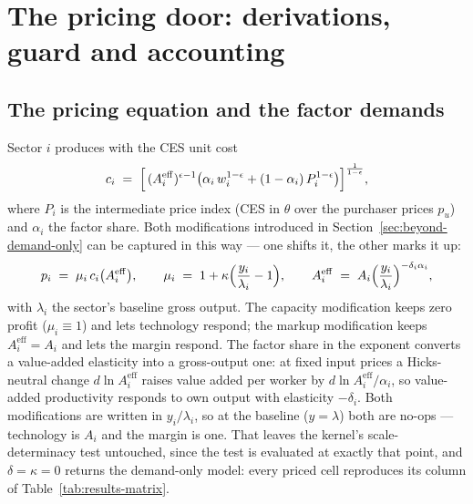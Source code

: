 \section{The pricing door: derivations, guard and accounting}\label{app:pricing-door}

\subsection{The pricing equation and the factor demands}\label{app:pricing-hooks}
Sector $i$ produces with the CES unit cost
\begin{equation}\label{eq:app-unit-cost}
  c_i \;=\; \Bigl[\,(A^{\mathrm{eff}}_i)^{\epsilon-1}\bigl(\alpha_i\,w_i^{1-\epsilon}
     + (1-\alpha_i)\,P_i^{1-\epsilon}\bigr)\Bigr]^{\frac{1}{1-\epsilon}},
\end{equation}
where $P_i$ is the intermediate price index (CES in $\theta$ over the purchaser
prices $p_u$) and $\alpha_i$ the factor share. Both modifications introduced in Section~\ref{sec:beyond-demand-only} can be captured in this way ---
one shifts it, the other marks it up:
\begin{equation}\label{eq:app-price-rule}
  p_i \;=\; \mu_i\,c_i\bigl(A^{\mathrm{eff}}_i\bigr),
  \qquad
  \mu_i \;=\; 1 + \kappa\Bigl(\frac{y_i}{\lambda_i} - 1\Bigr),
  \qquad
  A^{\mathrm{eff}}_i \;=\; A_i\Bigl(\frac{y_i}{\lambda_i}\Bigr)^{-\delta_i \alpha_i},
\end{equation}
with $\lambda_i$ the sector's baseline gross output. The capacity modification keeps zero profit ($\mu_i \equiv 1$) and lets technology respond; the markup modification keeps $A^{\mathrm{eff}}_i = A_i$ and lets the margin respond. The factor share in the
exponent converts a value-added elasticity into a gross-output one: at fixed input
prices a Hicks-neutral change $d\ln A^{\mathrm{eff}}_i$ raises value added per worker
by $d\ln A^{\mathrm{eff}}_i/\alpha_i$, so value-added productivity responds to own
output with elasticity $-\delta_i$. Both modifications are written in $y_i/\lambda_i$, so at the baseline ($y = \lambda$)
both are no-ops --- technology is $A_i$ and the margin is one. That leaves the kernel's
scale-determinacy test untouched, since the test is evaluated at exactly that point, and
$\delta = \kappa = 0$ returns the demand-only model: every priced cell reproduces its
column of Table~\ref{tab:results-matrix}.

